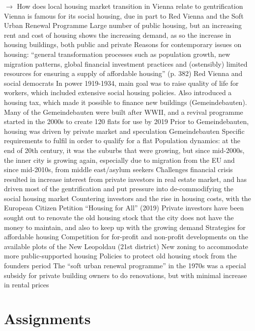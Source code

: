 \documentclass{article}
\begin{document}
\begin{outline}
	\1 $\rightarrow$ How does local housing market transition in Vienna relate to gentrification
	\1 Vienna is famous for its social housing, due in part to Red Vienna and the Soft Urban Renewal Programme
	\1 Large number of public housing, but an increasing rent and cost of housing shows the increasing demand, as so the increase in housing buildings, both public and private
	\1 Reasons for contemporary issues on housing: ``general transformation processes such as population growth, new migration patterns, global financial investment practices and (ostensibly) limited resources for ensuring a supply of affordable housing'' (p. 382)
	\1 Red Vienna and social democrats
		\2 In power 1919-1934, main goal was to raise quality of life for workers, which included extensive social housing policies. Also introduced a housing tax, which made it possible to finance new buildings (Gemeindebauten). Many of the Gemeindebauten were built after WWII, and a revival programme started in the 2000s to create 120 flats for use by 2019
		\2 Prior to Gemeindebauten, housing was driven by private market and speculation
	\1 Gemeindebauten
		\2 Specific requirements to fulfil in order to qualify for a flat 
	\1 Population dynamics: at the end of 20th century, it was the suburbs that were growing, but since mid-2000s, the inner city is growing again, especially due to migration from the EU and since mid-2010s, from middle east/asylum seekers
	\1 Challenges
		 financial crisis resulted in increase interest from private investors in real estate market, and has driven most of the gentrification and put pressure into de-commodifying the social housing market
		\2 Countering investors and the rise in housing costs, with the European Citizen Petition ``Housing for All'' (2019)
		\2 Private investors have been sought out to renovate the old housing stock that the city does not have the money to maintain, and also to keep up with the growing demand
	\1 Strategies for affordable housing
		\2 Competition for for-profit and non-profit developments on the available plots of the New Leopoldau (21st district)
		\2 New zoning to accommodate more public-supported housing 
		\2 Policies to protect old housing stock from the founders period
		\2 The ``soft urban renewal programme'' in the 1970s was a special subsidy for private building owners to do renovations, but with minimal increase in rental prices
\end{outline}

\section{Assignments}
\end{document}
